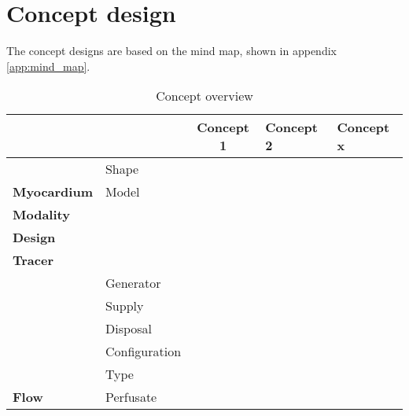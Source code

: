 \chapter{Concept design}
The concept designs are based on the mind map, shown in appendix \ref{app:mind_map}.

\begin{table}[H]
\caption{Concept overview}
\begin{tabular}{l|llll}
\textbf{}                                                  &                               & \multicolumn{1}{c}{Concept 1} & Concept 2                & Concept x                                     \\ \hline
\multicolumn{1}{c|}{}                                      & \cellcolor{red}Shape &\cellcolor{red}      & \cellcolor{red} & \multicolumn{1}{l|}{\cellcolor{red}} \\
\multicolumn{1}{c|}{\multirow{-2}{*}{\textbf{Myocardium}}} & Model                         &                               &                          & \multicolumn{1}{l|}{}                         \\
\textbf{Modality}                                          & \cellcolor{red}      & \cellcolor{red}      & \cellcolor{red} & \multicolumn{1}{l|}{\cellcolor{red}} \\
\textbf{Design}                                            &                               &                               &                          & \multicolumn{1}{l|}{}                         \\
\textbf{Tracer}                                            & \cellcolor{red}      & \cellcolor{red}      & \cellcolor{red} & \multicolumn{1}{l|}{\cellcolor{red}} \\
                                                           & Generator                     &                               &                          & \multicolumn{1}{l|}{}                         \\
                                                           & Supply                        &                               &                          & \multicolumn{1}{l|}{}                         \\
                                                           & Disposal                      &                               &                          & \multicolumn{1}{l|}{}                         \\
                                                           & Configuration                 &                               &                          & \multicolumn{1}{l|}{}                         \\
                                                           & \cellcolor{red}Type  & \cellcolor{red}      & \cellcolor{red} & \multicolumn{1}{l|}{\cellcolor{red}} \\
\multirow{-6}{*}{\textbf{Flow}}                            & Perfusate                     &                               &                          & \multicolumn{1}{l|}{}                         \\ \cline{2-5} 
\end{tabular}
\end{table}

